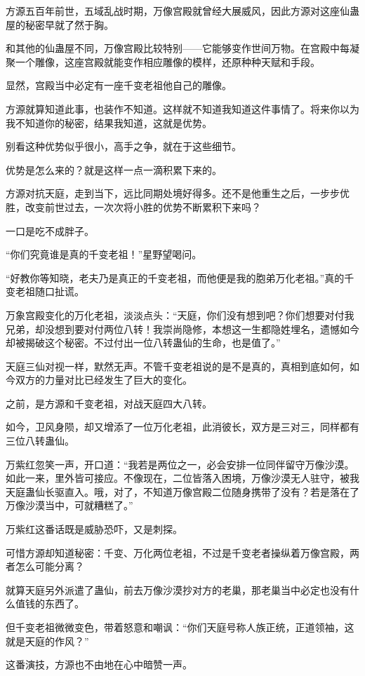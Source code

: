\begin{this_body}
方源五百年前世，五域乱战时期，万像宫殿就曾经大展威风，因此方源对这座仙蛊屋的秘密早就了然于胸。

和其他的仙蛊屋不同，万像宫殿比较特别——它能够变作世间万物。在宫殿中每凝聚一个雕像，这座宫殿就能变作相应雕像的模样，还原种种天赋和手段。

显然，宫殿当中必定有一座千变老祖他自己的雕像。

方源就算知道此事，也装作不知道。这样就不知道我知道这件事情了。将来你以为我不知道你的秘密，结果我知道，这就是优势。

别看这种优势似乎很小，高手之争，就在于这些细节。

优势是怎么来的？就是这样一点一滴积累下来的。

方源对抗天庭，走到当下，远比同期处境好得多。还不是他重生之后，一步步优胜，改变前世过去，一次次将小胜的优势不断累积下来吗？

一口是吃不成胖子。

“你们究竟谁是真的千变老祖！”星野望喝问。

“好教你等知晓，老夫乃是真正的千变老祖，而他便是我的胞弟万化老祖。”真的千变老祖随口扯谎。

万象宫殿变化的万化老祖，淡淡点头：“天庭，你们没有想到吧？你们想要对付我兄弟，却没想到要对付两位八转！我崇尚隐修，本想这一生都隐姓埋名，遗憾如今却被揭破这个秘密。不过付出一位八转蛊仙的生命，也是值了。”

天庭三仙对视一样，默然无声。不管千变老祖说的是不是真的，真相到底如何，如今双方的力量对比已经发生了巨大的变化。

之前，是方源和千变老祖，对战天庭四大八转。

如今，卫风身陨，却又增添了一位万化老祖，此消彼长，双方是三对三，同样都有三位八转蛊仙。

万紫红忽笑一声，开口道：“我若是两位之一，必会安排一位同伴留守万像沙漠。如此一来，里外皆可接应。不像现在，二位皆落入困境，万像沙漠无人驻守，被我天庭蛊仙长驱直入。哦，对了，不知道万像宫殿二位随身携带了没有？若是落在了万像沙漠当中，可就糟糕了。”

万紫红这番话既是威胁恐吓，又是刺探。

可惜方源却知道秘密：千变、万化两位老祖，不过是千变老者操纵着万像宫殿，两者怎么可能分离？

就算天庭另外派遣了蛊仙，前去万像沙漠抄对方的老巢，那老巢当中必定也没有什么值钱的东西了。

但千变老祖微微变色，带着怒意和嘲讽：“你们天庭号称人族正统，正道领袖，这就是天庭的作风？”

这番演技，方源也不由地在心中暗赞一声。


\end{this_body}
